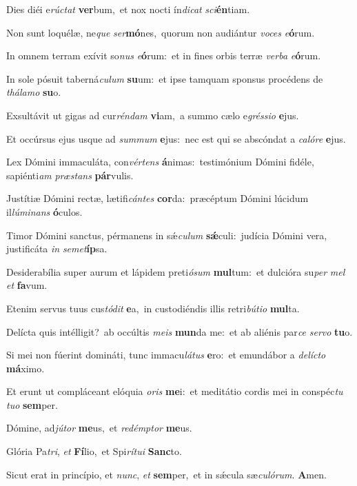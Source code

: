 ﻿Dies diéi e\textit{rúc}\textit{tat} \textbf{ver}bum,~\redgreheightstar et nox nocti ín\textit{di}\textit{cat} \textit{sci}\textbf{én}tiam.

Non sunt loquélæ, ne\textit{que} \textit{ser}\textbf{mó}nes,~\redgreheightstar quorum non audiántur \textit{vo}\textit{ces} \textit{e}\textbf{ó}rum.

In omnem terram exívit so\textit{nus} \textit{e}\textbf{ó}rum:~\redgreheightstar et in fines orbis terræ \textit{ver}\textit{ba} \textit{e}\textbf{ó}rum.

In sole pósuit taberná\textit{cu}\textit{lum} \textbf{su}um:~\redgreheightstar et ipse tamquam sponsus procédens de \textit{thá}\textit{la}\textit{mo} \textbf{su}o.

Exsultávit ut gigas ad cur\textit{rén}\textit{dam} \textbf{vi}am,~\redgreheightstar a summo cælo e\textit{grés}\textit{si}\textit{o} \textbf{e}jus.

Et occúrsus ejus usque ad \textit{sum}\textit{mum} \textbf{e}jus:~\redgreheightstar nec est qui se abscóndat a \textit{ca}\textit{ló}\textit{re} \textbf{e}jus.

Lex Dómini immaculáta, con\textit{vér}\textit{tens} \textbf{á}nimas:~\redgreheightstar testimónium Dómini fidéle, sapiénti\textit{am} \textit{præ}\textit{stans} \textbf{pár}vulis.

Justítiæ Dómini rectæ, lætifi\textit{cán}\textit{tes} \textbf{cor}da:~\redgreheightstar præcéptum Dómini lúcidum il\textit{lú}\textit{mi}\textit{nans} \textbf{ó}culos.

Timor Dómini sanctus, pérmanens in sǽ\textit{cu}\textit{lum} \textbf{sǽ}culi:~\redgreheightstar judícia Dómini vera, justificáta \textit{in} \textit{se}\textit{met}\textbf{íp}sa.

Desiderabília super aurum et lápidem preti\textit{ó}\textit{sum} \textbf{mul}tum:~\redgreheightstar et dulcióra su\textit{per} \textit{mel} \textit{et} \textbf{fa}vum.

Etenim servus tuus cus\textit{tó}\textit{dit} \textbf{e}a,~\redgreheightstar in custodiéndis illis retri\textit{bú}\textit{ti}\textit{o} \textbf{mul}ta.

Delícta quis intélligit?~\reddagger ab occúltis \textit{me}\textit{is} \textbf{mun}da me:~\redgreheightstar et ab aliénis par\textit{ce} \textit{ser}\textit{vo} \textbf{tu}o.

Si mei non fúerint domináti, tunc immacu\textit{lá}\textit{tus} \textbf{e}ro:~\redgreheightstar et emundábor a \textit{de}\textit{líc}\textit{to} \textbf{má}ximo.

Et erunt ut compláceant elóquia \textit{o}\textit{ris} \textbf{me}i:~\redgreheightstar et meditátio cordis mei in conspéc\textit{tu} \textit{tu}\textit{o} \textbf{sem}per.

Dómine, ad\textit{jú}\textit{tor} \textbf{me}us,~\redgreheightstar et \textit{red}\textit{émp}\textit{tor} \textbf{me}us.

Glória Pa\textit{tri}, \textit{et} \textbf{Fí}lio,~\redgreheightstar et Spi\textit{rí}\textit{tu}\textit{i} \textbf{Sanc}to.

Sicut erat in princípio, et \textit{nunc}, \textit{et} \textbf{sem}per,~\redgreheightstar et in sǽcula sæ\textit{cu}\textit{ló}\textit{rum}. \textbf{A}men.
